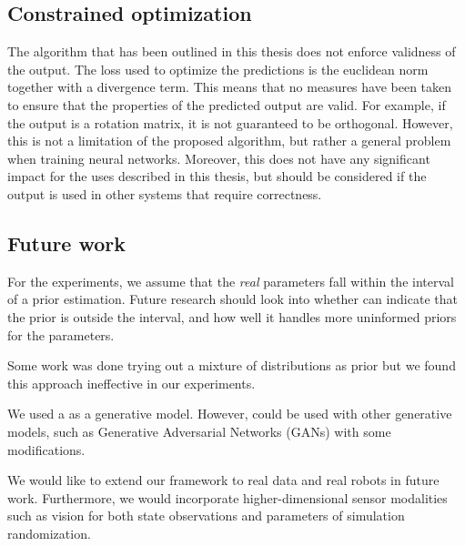 \subsection{Constrained optimization}

The \dettostoc{} algorithm that has been outlined in this thesis does not enforce validness of the output. The loss used to optimize the predictions is the euclidean norm together with a divergence term. This means that no measures have been taken to ensure that the properties of the predicted output are valid. For example, if the output is a rotation matrix, it is not guaranteed to be orthogonal. However, this is not a limitation of the proposed \dettostoc{} algorithm, but rather a general problem when training neural networks. Moreover, this does not have any significant impact for the uses described in this thesis, but should be considered if the output is used in other systems that require correctness. %

\subsection{Future work}

For the experiments, we assume that the \textit{real} parameters fall within the interval of a prior estimation. Future research should look into whether \dettostoc{} can indicate that the prior is outside the interval, and how well it handles more uninformed priors for the parameters.

Some work was done trying out a mixture of distributions as prior \parencite{DBLP:journals/corr/DilokthanakulMG16} but we found this approach ineffective in our experiments.

We used a \cvae{} as a generative model. However, \dettostoc{} could be used with other generative models, such as Generative Adversarial Networks (GANs) \parencite{goodfellow2014} with some modifications.

We would like to extend our framework to real data and real robots in future work. Furthermore, we would incorporate higher-dimensional sensor modalities such as vision for both state observations and parameters of simulation randomization.